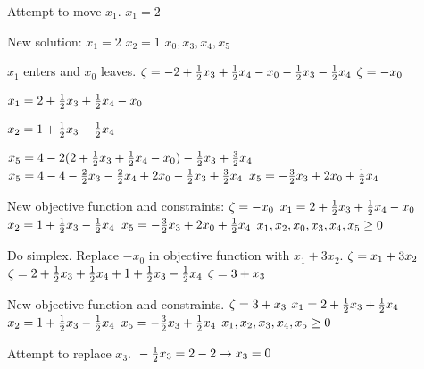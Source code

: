 \documentclass[17pt]{extarticle}
\begin{document}
\bigskip Attempt to move $x_1$.
$x_1 = 2$

\bigskip New solution:
$x_1 = 2$
$x_2 = 1$
$x_0, x_3, x_4, x_5$

\bigskip $x_1$ enters and $x_0$ leaves.
$\\ \zeta = - 2 + \frac{1}{2}x_3 + \frac{1}{2}x_4 - x_0 - \frac{1}{2}x_3 - \frac{1}{2}x_4$
$\\ \zeta = - x_0$

$\\ x_1 = 2 + \frac{1}{2}x_3 + \frac{1}{2}x_4 - x_0$

$\\ x_2 = 1 + \frac{1}{2}x_3 - \frac{1}{2}x_4$

$\\ x_5 = 4 - 2(2 + \frac{1}{2}x_3 + \frac{1}{2}x_4 - x_0) - \frac{1}{2}x_3 + \frac{3}{2}x_4$
$\\ x_5 = 4 - 4 - \frac{2}{2}x_3 - \frac{2}{2}x_4 + 2x_0 - \frac{1}{2}x_3 + \frac{3}{2}x_4$
$\\ x_5 = - \frac{3}{2}x_3 + 2x_0 + \frac{1}{2}x_4$

\bigskip New objective function and constraints:
$\\ \zeta = - x_0$
$\\ x_1 = 2 + \frac{1}{2}x_3 + \frac{1}{2}x_4 - x_0$
$\\ x_2 = 1 + \frac{1}{2}x_3 - \frac{1}{2}x_4$
$\\ x_5 = - \frac{3}{2}x_3 + 2x_0 + \frac{1}{2}x_4$
$\\ x_1, x_2, x_0, x_3, x_4, x_5 \geq 0$

\bigskip Do simplex. Replace $-x_0$ in objective function with $x_1 + 3x_2$.
$\\ \zeta = x_1 + 3x_2$
$\\ \zeta = 2 + \frac{1}{2}x_3 + \frac{1}{2}x_4 + 1 + \frac{1}{2}x_3 - \frac{1}{2}x_4$
$\\ \zeta = 3 + x_3$

\bigskip New objective function and constraints.
$\\ \zeta = 3 + x_3$
$\\ x_1 = 2 + \frac{1}{2}x_3 + \frac{1}{2}x_4$
$\\ x_2 = 1 + \frac{1}{2}x_3 - \frac{1}{2}x_4$
$\\ x_5 = - \frac{3}{2}x_3 + \frac{1}{2}x_4$
$\\ x_1, x_2, x_3, x_4, x_5 \geq 0$

\bigskip Attempt to replace $x_3$.
$\\ -\frac{1}{2}x_3 = 2 - 2 \to x_3 = 0$
\end{document}
